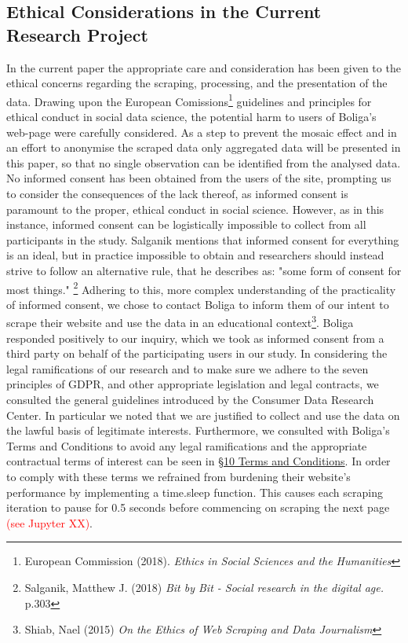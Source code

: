 \documentclass[12pt,a4paper]{article}
\begin{document}
\subsection{Ethical Considerations in the Current Research Project}
In the current paper the appropriate care and consideration has been given to the ethical concerns regarding the scraping, processing, and the presentation of the data. Drawing upon the European Comissions\footnote{European Commission (2018). \textit{Ethics in Social Sciences and the Humanities}} guidelines and principles for ethical conduct in social data science, the potential harm to users of Boliga's web-page were carefully considered. As a step to prevent the mosaic effect and in an effort to anonymise the scraped data only aggregated data will be presented in this paper, so that no single observation can be identified from the analysed data.\newline
No informed consent has been obtained from the users of the site, prompting us to consider the consequences of the lack thereof, as informed consent is paramount to the proper, ethical conduct in social science. However, as in this instance, informed consent can be logistically impossible to collect from all participants in the study. Salganik mentions that informed consent for everything is an ideal, but in practice impossible to obtain and researchers should instead strive to follow an alternative rule, that he describes as: "some form of consent for most things." \footnote{Salganik, Matthew J. (2018) \textit{Bit by Bit - Social research in the digital age.} p.303} Adhering to this, more complex understanding of the practicality of informed consent, we chose to contact Boliga to inform them of our intent to scrape their website and use the data in an educational context\footnote{Shiab, Nael (2015) \textit{On the Ethics of Web Scraping and Data Journalism}}. Boliga responded positively to our inquiry, which we took as informed consent from a third party on behalf of the participating users in our study.\newline
In considering the legal ramifications of our research and to make sure we adhere to the seven principles of GDPR, and other appropriate legislation and legal contracts, we consulted the general guidelines introduced by the Consumer Data Research Center. In particular we noted that we are justified to collect and use the data on the lawful basis of legitimate interests. Furthermore, we consulted with Boliga's Terms and Conditions to avoid any legal ramifications and the appropriate contractual terms of interest can be seen in \href{https://www.boliga.dk/vilkaar-og-betingelser}{§10 Terms and Conditions}. In order to comply with these terms we refrained from burdening their website's performance by implementing a time.sleep function. This causes each scraping iteration to pause for 0.5 seconds before commencing on scraping the next page \textcolor{red}{(see Jupyter XX)}. 
\end{document}
